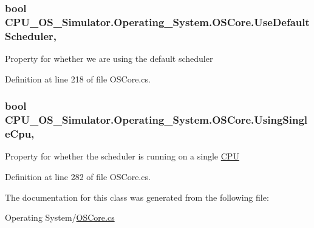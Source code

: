 \subsubsection[{Use\+Default\+Scheduler}]{\setlength{\rightskip}{0pt plus 5cm}bool C\+P\+U\+\_\+\+O\+S\+\_\+\+Simulator.\+Operating\+\_\+\+System.\+O\+S\+Core.\+Use\+Default\+Scheduler\hspace{0.3cm}{\ttfamily [get]}, {\ttfamily [set]}}\label{class_c_p_u___o_s___simulator_1_1_operating___system_1_1_o_s_core_a1fd8b54b31fa415f09f2b9bc407802dd}


Property for whether we are using the default scheduler 



Definition at line 218 of file O\+S\+Core.\+cs.

\hypertarget{class_c_p_u___o_s___simulator_1_1_operating___system_1_1_o_s_core_ac965e1317dc5c6b6ae93c410098dd913}{}
\subsubsection[{Using\+Single\+Cpu}]{\setlength{\rightskip}{0pt plus 5cm}bool C\+P\+U\+\_\+\+O\+S\+\_\+\+Simulator.\+Operating\+\_\+\+System.\+O\+S\+Core.\+Using\+Single\+Cpu\hspace{0.3cm}{\ttfamily [get]}, {\ttfamily [set]}}\label{class_c_p_u___o_s___simulator_1_1_operating___system_1_1_o_s_core_ac965e1317dc5c6b6ae93c410098dd913}


Property for whether the scheduler is running on a single \hyperlink{namespace_c_p_u___o_s___simulator_1_1_c_p_u}{C\+P\+U} 



Definition at line 282 of file O\+S\+Core.\+cs.



The documentation for this class was generated from the following file\+:\begin{DoxyCompactItemize}
\item 
Operating System/\hyperlink{_o_s_core_8cs}{O\+S\+Core.\+cs}\end{DoxyCompactItemize}
